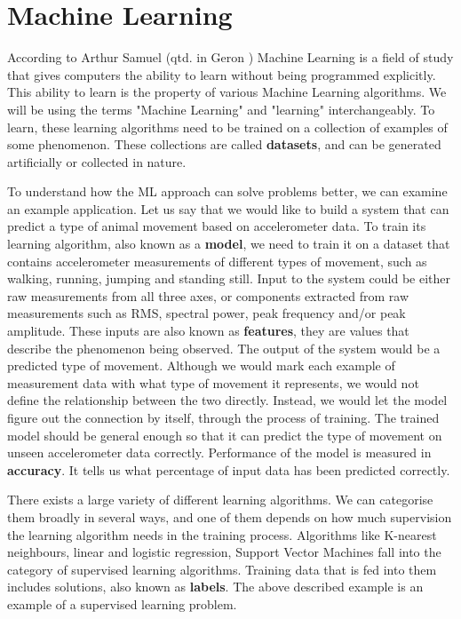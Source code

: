 \section{ Machine Learning}

According to Arthur Samuel (qtd. in Geron \cite{geron}) Machine Learning is a field of study that gives computers the ability to learn without being programmed explicitly.
This ability to learn is the property of various Machine Learning algorithms.
We will be using the terms "Machine Learning" and "learning" interchangeably. 
To learn, these learning algorithms need to be trained on a collection of examples of some phenomenon\cite{burkovml}. 
These collections are called \textbf{datasets}, and can be generated artificially or collected in nature.

To understand how the ML approach can solve problems better, we can examine an example application.
Let us say that we would like to build a system that can predict a type of animal movement based on accelerometer data.
To train its learning algorithm, also known as a \textbf{model}, we need to train it on a dataset that contains accelerometer measurements of different types of movement, such as walking, running, jumping and standing still.
Input to the system could be either raw measurements from all three axes, or components extracted from raw measurements such as RMS, spectral power, peak frequency and/or peak amplitude. 
These inputs are also known as \textbf{features}, they are values that describe the phenomenon being observed\cite{burkovml}. 
The output of the system would be a predicted type of movement.
Although we would mark each example of measurement data with what type of movement it represents, we would not define the relationship between the two directly.
Instead, we would let the model figure out the connection by itself, through the process of training.
The trained model should be general enough so that it can predict the type of movement on unseen accelerometer data correctly.
Performance of the model is measured in \textbf{accuracy}.
It tells us what percentage of input data has been predicted correctly.

There exists a large variety of different learning algorithms. 
We can categorise them  broadly in several ways, and one of them depends on how much supervision the learning algorithm needs in the training process. 
Algorithms like K-nearest neighbours, linear and logistic regression, Support Vector Machines fall into the category of supervised learning algorithms.
Training data that is fed into them includes solutions, also known as \textbf{labels}\cite{geron}.
The above described example is an example of a supervised learning problem.

